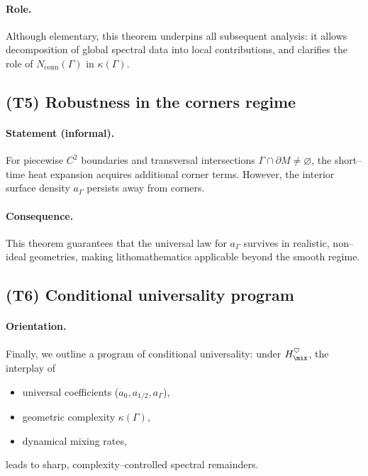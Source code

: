 \paragraph{Role.}
Although elementary, this theorem underpins all subsequent analysis: 
it allows decomposition of global spectral data into local contributions, 
and clarifies the role of $N_{\mathrm{conn}}(\Gamma)$ in $\kappa(\Gamma)$.

\subsection{(T5) Robustness in the corners regime}

\paragraph{Statement (informal).}
For piecewise $C^2$ boundaries and transversal intersections 
$\Gamma\cap\partial M\neq \varnothing$, 
the short–time heat expansion acquires additional corner terms. 
However, the interior surface density $a_\Gamma$ persists away from corners.

\paragraph{Consequence.}
This theorem guarantees that the universal law for $a_\Gamma$ 
survives in realistic, non–ideal geometries, 
making lithomathematics applicable beyond the smooth regime.

\subsection{(T6) Conditional universality program}

\paragraph{Orientation.}
Finally, we outline a program of conditional universality: 
under $H_{\mix}^\heartsuit$, the interplay of 
\begin{itemize}
  \item universal coefficients ($a_0,a_{1/2},a_\Gamma$),
  \item geometric complexity $\kappa(\Gamma)$,
  \item dynamical mixing rates,
\end{itemize}
leads to sharp, complexity–controlled spectral remainders.

